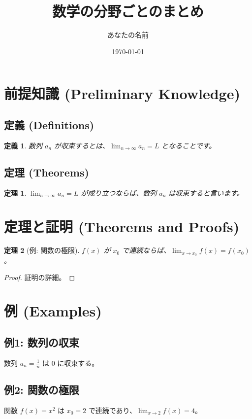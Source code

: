 \documentclass[12pt]{article}
\title{数学の分野ごとのまとめ}
\author{あなたの名前}
\date{\today}
\newtheorem{definition}{定義}[section]  %
\newtheorem{theorem}{定理}[section]     %
\begin{document}
\maketitle

\tableofcontents  %

\section{前提知識 (Preliminary Knowledge)}
\subsection{定義 (Definitions)}
\begin{definition}
    数列 $a_n$ が収束するとは、$\lim_{n \to \infty} a_n = L$ となることです。
\end{definition}

\subsection{定理 (Theorems)}
\begin{theorem}
    $\lim_{n \to \infty} a_n = L$ が成り立つならば、数列 $a_n$ は収束すると言います。
\end{theorem}

\section{定理と証明 (Theorems and Proofs)}
\begin{theorem}[例: 関数の極限]
    $f(x)$ が $x_0$ で連続ならば、$\lim_{x \to x_0} f(x) = f(x_0)$。
\end{theorem}

\begin{proof}
    証明の詳細。
\end{proof}

\section{例 (Examples)}
\subsection{例1: 数列の収束}
数列 $a_n = \frac{1}{n}$ は $0$ に収束する。

\subsection{例2: 関数の極限}
関数 $f(x) = x^2$ は $x_0 = 2$ で連続であり、$\lim_{x \to 2} f(x) = 4$。
\end{document}
